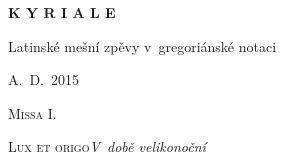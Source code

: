 \documentclass[12pt]{article} %
\begin{document}
\begin{titlepage}
  \begin{center}

    { \vspace*{60 mm} }
    \begin{Huge}\textbf{K Y R I A L E}\end{Huge}

    \vspace{30 mm}
    \begin{Large}{Latinské mešní zpěvy v~gregoriánské notaci}\end{Large}

    \vspace{110 mm}
    \begin{large}{A.~D.~2015}\end{large}

  \end{center}
\end{titlepage}





\def\greinitialformat#1{{\fontsize{43}{43}\selectfont #1}}

\redlines






%

\begin{center}\begin{huge}\textsc{Missa I.}\end{huge}\end{center}
\begin{large}\textsc{Lux et origo}\hfill{\em V~době velikonoční}\end{large}

\vspace{0.5 cm}

\vspace{1 cm}
\end{document}
